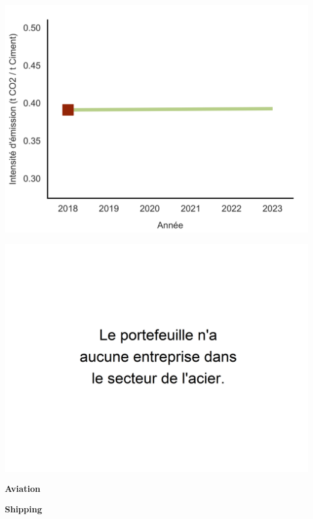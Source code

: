 \documentclass[10pt,table,a4]{article}\usepackage[]{graphicx}\usepackage[]{color}
\begin{document}
	\begin{multicols}{2}
		
		\includegraphics[width=.9\linewidth]{ReportOutputs/Fig30} \vfill\null \columnbreak
		
		\includegraphics[width=.9\linewidth]{ReportOutputs/Fig31}
		
	\end{multicols}
	
	\begin{multicols}{2}
		
		\textbf{Aviation}
		
		\textbf{Shipping}
		
	\end{multicols}
	
	\vspace{0cm}
	
\end{document}

